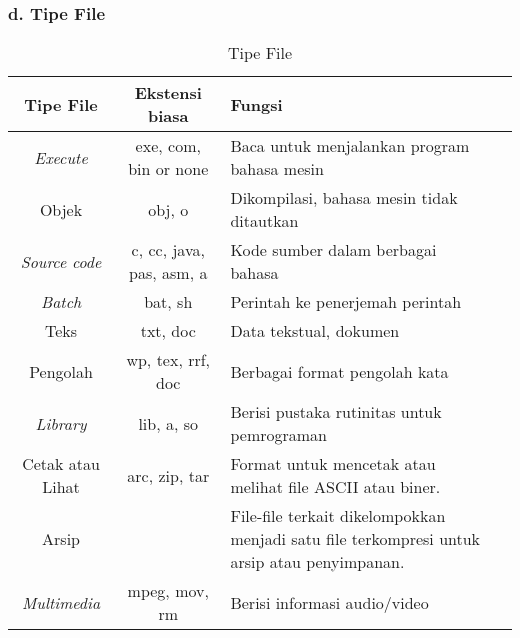 \documentclass[12pt]{article}
\begin{document}
\subsubsection*{d. Tipe File}

\begin{table}[htbp] %
    \centering
    \begin{tabular}{|c|c|p{6cm}|p{8cm}|} %
    \hline
\textbf{Tipe File}      & \textbf{Ekstensi biasa}        & \textbf{Fungsi}                                                      \\ \hline
\textit{Execute}              & exe, com, bin or none           & Baca untuk menjalankan program bahasa mesin                                   \\ \hline
Objek                  & obj, o                          & Dikompilasi, bahasa mesin tidak ditautkan                                  \\ \hline
\textit{Source code}             & c, cc, java, pas, asm, a        & Kode sumber dalam berbagai bahasa                                      \\ \hline
\textit{Batch}                   & bat, sh                        & Perintah ke penerjemah perintah                                    \\ \hline
Teks                   & txt, doc                        & Data tekstual, dokumen                                                 \\ \hline
Pengolah          & wp, tex, rrf, doc            & Berbagai format pengolah kata                                          \\ \hline
\textit{Library}                & lib, a, so                & Berisi pustaka rutinitas untuk pemrograman                                   \\ \hline
Cetak atau Lihat           & arc, zip, tar                  & Format untuk mencetak atau melihat file ASCII atau biner.              \\ \hline
Arsip                 & {arc, zip, tar                   & File-file terkait dikelompokkan menjadi satu file terkompresi untuk arsip atau penyimpanan. \\ \hline
\textit{Multimedia}              & mpeg, mov, rm                  & Berisi informasi audio/video                       \\ \hline
\end{tabular}

    \caption{Tipe File}
\end{table}
\end{document}
